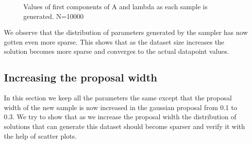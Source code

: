 \documentclass{article}
\begin{document}
\begin{figure}[H]
	\centerline{
		}
	\caption{Values of first components of A and lambda as each sample is generated. N=10000}
	\label{1.fig:r3_seq}
\end{figure}
We observe that the distribution of parameters generated by the sampler has now gotten even more sparse. This shows that as the dataset size increases the solution becomes more sparse and converges to the actual datapoint values.

\newpage
\subsection{Increasing the proposal width} %
In this section we keep all the parameters the same except that the proposal width of the new sample is now increased in the gaussian proposal from 0.1 to 0.3. We try to show that as we increase the proposal width the distribution of solutions that can generate this dataset should become sparser and verify it with the help of scatter plots.\\
\end{document}
